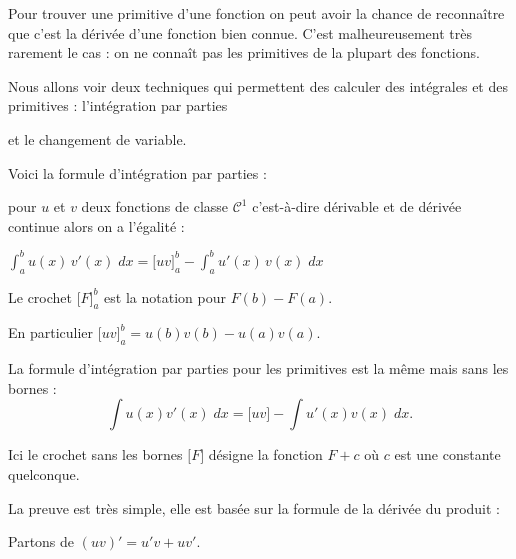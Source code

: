 







\debuttexte

\diapo

\change

Pour trouver une primitive d'une fonction on peut avoir la chance de reconnaître 
que c'est la dérivée d'une fonction bien connue. C'est malheureusement très rarement le cas : 
on ne connaît pas les primitives de la plupart des fonctions. 

\change

Nous allons 
voir deux techniques qui permettent des calculer des intégrales et des primitives : 
l'intégration par parties 

\change

et le changement de variable.



\diapo

Voici la formule d'intégration par parties :

pour $u$ et $v$ deux fonctions de classe $\mathcal{C}^1$ 
c'est-à-dire dérivable et de dérivée continue alors on a l'égalité :

$\int_a^b u(x) \, v'(x)\;dx= \big[uv\big]_a^b - \int_a^b u'(x) \, v(x)\;dx$

\change
 Le crochet $\big[F\big]_a^b$ est la notation pour $F(b)-F(a)$.

En particulier $\big[uv\big]_a^b = u(b)v(b)-u(a)v(a)$.

\change

La formule d'intégration par parties pour les primitives est la même mais sans les bornes :
$$\int u(x)v'(x)\;dx= \big[uv\big] - \int u'(x)v(x)\;dx.$$

\change

Ici le crochet sans les bornes $\big[F\big]$ désigne la fonction $F+c$ où $c$ est une constante quelconque.


\change


La preuve est très simple, elle est basée sur la formule de la dérivée du produit :

Partons de $(uv)'=u'v+uv'$.

\change

